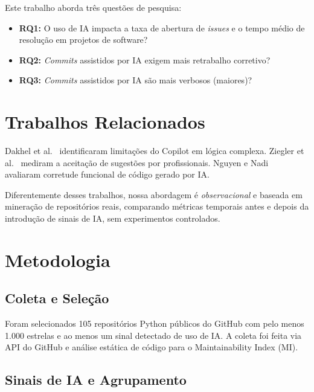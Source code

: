 \documentclass[12pt,a4paper,twocolumn]{article}
\begin{document}
Este trabalho aborda três questões de pesquisa:

\begin{itemize}[leftmargin=1.2em,itemsep=2pt,topsep=2pt]
  \item \textbf{RQ1:} O uso de IA impacta a taxa de abertura de \textit{issues}
    e o tempo médio de resolução em projetos de software?
  \item \textbf{RQ2:} \textit{Commits} assistidos por IA exigem mais retrabalho
    corretivo?
  \item \textbf{RQ3:} \textit{Commits} assistidos por IA são mais verbosos
    (maiores)?
\end{itemize}

\section{Trabalhos Relacionados}

Dakhel et al.~\cite{dakhel2023copilot} identificaram limitações do Copilot em
lógica complexa. Ziegler et al.~\cite{ziegler2022copilot} mediram a aceitação
de sugestões por profissionais. Nguyen e Nadi~\cite{nguyen2022copilot} avaliaram
corretude funcional de código gerado por IA.

Diferentemente desses trabalhos, nossa abordagem é \textit{observacional} e baseada
em mineração de repositórios reais, comparando métricas temporais antes e depois da
introdução de sinais de IA, sem experimentos controlados.

\section{Metodologia}

\subsection{Coleta e Seleção}

Foram selecionados 105 repositórios Python públicos do GitHub com pelo menos 1.000
estrelas e ao menos um sinal detectado de uso de IA. A coleta foi feita via API do
GitHub e análise estática de código para o Maintainability Index (MI).

\subsection{Sinais de IA e Agrupamento}
\end{document}
